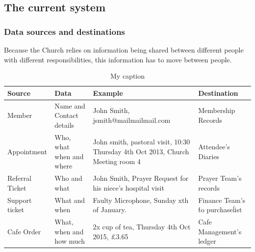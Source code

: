 \subsection{The current system}

\subsubsection{Data sources and destinations}
Because the Church relies on information being shared between different people with different responsibilities, this information has to move between people.

\begin{table}[]
\centering
\caption{My caption}
\label{my-label}
\begin{tabular}{llll}
\hline
\multicolumn{1}{|l|}{Source}             & \multicolumn{1}{l|}{Data}                     & \multicolumn{1}{l|}{Example}                                                                         & \multicolumn{1}{l|}{Destination}                       \\ \hline
\multicolumn{1}{|l|}{Member}             & \multicolumn{1}{l|}{Name and Contact details} & \multicolumn{1}{l|}{John Smith, jsmith@mailmailmail.com}                                             & \multicolumn{1}{l|}{Membership Records}                \\ \hline
\multicolumn{1}{|l|}{Appointment}        & \multicolumn{1}{l|}{Who, what when and where} & \multicolumn{1}{l|}{John smith, pastoral visit, 10:30 Thursday  4th Oct 2013, Church Meeting room 4} & \multicolumn{1}{l|}{Attendee's Diaries}                \\ \hline
\multicolumn{1}{|l|}{Referral Ticket}    & \multicolumn{1}{l|}{Who and what}             & \multicolumn{1}{l|}{John Smith, Prayer Request for his niece's hospital visit}                       & \multicolumn{1}{l|}{Prayer Team's records}             \\ \hline
\multicolumn{1}{|l|}{Support ticket}     & \multicolumn{1}{l|}{What and when}            & \multicolumn{1}{l|}{Faulty Microphone, Sunday xth of January.}                                       & \multicolumn{1}{l|}{Finance Team's \'to purchase\' list} \\ \hline
\multicolumn{1}{|l|}{Cafe Order}         & \multicolumn{1}{l|}{What, when and how much}  & \multicolumn{1}{l|}{2x cup of tea, Thursday 4th Oct 2015, £3.65}                                     & \multicolumn{1}{l|}{Cafe Management's ledger}          \\ \hline

\end{tabular}
\end{table}
